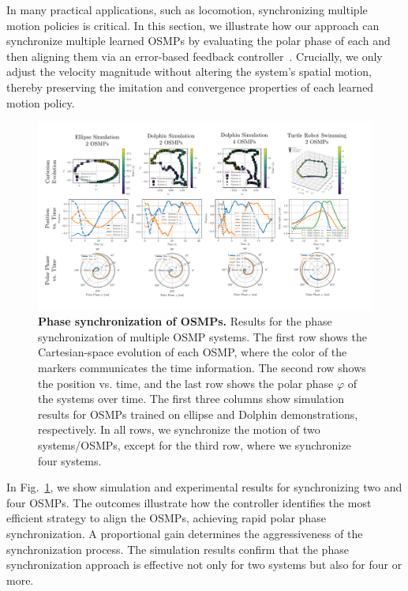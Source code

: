 In many practical applications, such as locomotion, synchronizing multiple motion policies is critical. In this section, we illustrate how our approach can synchronize multiple learned \glspl{OSMP} by evaluating the polar phase of each and then aligning them via an error-based feedback controller~\citep{dorfler2014synchronization}. Crucially, we only adjust the velocity magnitude without altering the system’s spatial motion, thereby preserving the imitation and convergence properties of each learned motion policy.

\begin{figure}[h]
    \centering
    \includegraphics[width=1.0\linewidth]{osmp/figures/phase_sync_results/phase_sync_results_v1_cropped.pdf}
    \caption{\textbf{Phase synchronization of \glspl{OSMP}.}
    Results for the phase synchronization of multiple \gls{OSMP} systems. The first row shows the Cartesian-space evolution of each \gls{OSMP}, where the color of the markers communicates the time information. The second row shows the position vs. time, and the last row shows the polar phase $\varphi$ of the systems over time. 
    The first three columns show simulation results for \glspl{OSMP} trained on ellipse and Dolphin demonstrations, respectively. In all rows, we synchronize the motion of two systems/\glspl{OSMP}, except for the third row, where we synchronize four systems.
    }
    \label{fig:osmp:phase_sync_results}
\end{figure}

In Fig.~\ref{fig:osmp:phase_sync_results}, we show simulation and experimental results for synchronizing two and four \glspl{OSMP}. The outcomes illustrate how the controller identifies the most efficient strategy to align the \glspl{OSMP}, achieving rapid polar phase synchronization. A proportional gain determines the aggressiveness of the synchronization process. The simulation results confirm that the phase synchronization approach is effective not only for two systems but also for four or more.

